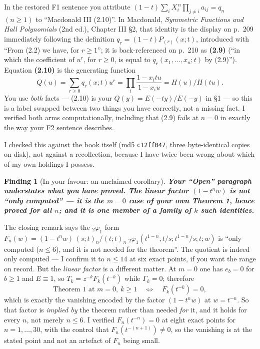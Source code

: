 \documentclass[11pt]{article}
\newtheorem{finding}{Finding}
\newcommand{\qpoch}[2]{(#1;t)_{#2}}
\newcommand{\Fn}{F}
\begin{document}
In the restored F1 sentence you attribute
$(1-t)\sum_i X_i^{\,n}\prod_{j\ne i}a_{ij}=q_n$ $(n\ge1)$ to ``Macdonald III (2.10)''.
In Macdonald, \emph{Symmetric Functions and Hall Polynomials} (2nd ed.), Chapter III \S2,
that identity is the display on p.~209 immediately following the definition
$q_r=(1-t)P_{(r)}(x;t)$, introduced with ``From (2.2) we have, for $r\ge1$''; it is
back-referenced on p.~210 as \textbf{(2.9)} (``in which the coefficient of $u^r$, for
$r\ge0$, is equal to $q_r(x_1,\dots,x_n;t)$ by (2.9)''). Equation \textbf{(2.10)} is the
generating function
\[
  Q(u)=\sum_{r\ge0}q_r(x;t)u^r=\prod_i\frac{1-x_itu}{1-x_iu}=H(u)/H(tu).
\]
You use \emph{both} facts --- (2.10) is your $Q(y)=E(-ty)/E(-y)$ in \S1 --- so this is a label
swapped between two things you have correctly, not a missing fact. I verified both arms
computationally, including that (2.9) fails at $n=0$ in exactly the way your F2 sentence
describes.

I checked this against the book itself (md5 \texttt{c12ff047}, three byte-identical copies
on disk), not against a recollection, because I have twice been wrong about which of my own
holdings I possess.

\begin{finding}[In your favour: an unclaimed corollary]
\textbf{Your ``Open'' paragraph understates what you have proved. The linear factor
$(1-t^nw)$ is not ``only computed'' --- it is the $m=0$ case of your own Theorem 1, hence
proved for all $n$; and it is one member of a family of $k$ such identities.}
\end{finding}

The closing remark says the $_2\varphi_1$ form
$\Fn_n(w)=(1-t^nw)\,\qpoch{s}{n}/\qpoch{t}{n}\;{}_2\varphi_1(t^{1-n},t/s;t^{1-n}/s;t;w)$
is ``only computed ($n\le6$), and it is not needed for the theorem''. The quotient is indeed
only computed --- I confirm it to $n\le14$ at six exact points, if you want the range on
record. But the \emph{linear factor} is a different matter. At $m=0$ one has $e_b=0$ for
$b\ge1$ and $E\equiv1$, so $T_k=z^{-k}\Fn_k(t^{-k})$ while $\Gamma_k=0$; therefore
\[
  \text{Theorem 1 at } m=0,\ k\ge1 \quad\Longleftrightarrow\quad \Fn_k(t^{-k})=0,
\]
which is exactly the vanishing encoded by the factor $(1-t^nw)$ at $w=t^{-n}$. So that factor
is \emph{implied by} the theorem rather than needed \emph{for} it, and it holds for every
$n$, not merely $n\le6$. I verified $\Fn_n(t^{-n})=0$ at eight exact points for
$n=1,\dots,30$, with the control that $\Fn_n(t^{-(n+1)})\ne0$, so the vanishing is at the
stated point and not an artefact of $\Fn_n$ being small.
\end{document}
